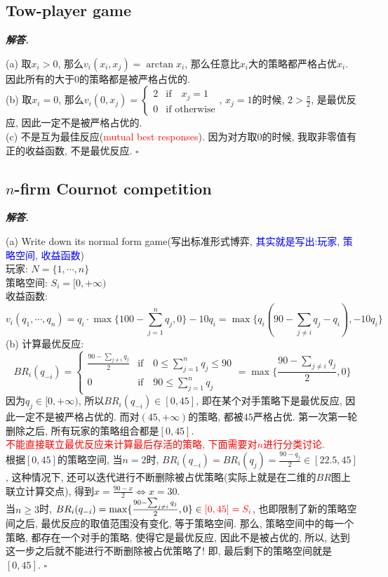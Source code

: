 \documentclass[10pt, a4paper, oneside]{ctexart}
\newenvironment{solution}{%
  \par\noindent\textbf{\textit{解答. }}\ignorespaces
}{%
  \hfill\ensuremath{\square}\par %
}
\begin{document}
\subsection{Tow-player game}
\begin{solution}
(a) 取$x_i>0$, 那么$v_i(x_i,x_j)=\arctan x_i$, 那么任意比$x_i$大的策略都严格占优$x_i$. 因此所有的大于$0$的策略都是被严格占优的.\\
(b) 取$x_i=0$, 那么$v_i(0,x_j)=\begin{cases}
    2& \text{if} \quad x_j=1\\
    0 & \text{if otherwise}
\end{cases}$, $x_j=1$的时候, $2>\frac{\pi}{2}$, 是最优反应, 因此一定不是被严格占优的.\\
(c) 不是互为最佳反应(\textcolor{red}{mutual best responses}). 因为对方取$0$的时候, 我取非零值有正的收益函数, 不是最优反应.
\end{solution}

\subsection{\texorpdfstring{$n$-firm Cournot competition}{n-firm Cournot competition}}


\begin{solution}
    (a) Write down its normal form game(写出标准形式博弈, \textcolor{blue}{其实就是写出:玩家, 策略空间, 收益函数})\\
    玩家: $N=\{1,\cdots,n\}$\\
    策略空间: $S_i=[0,+\infty)$\\
    收益函数: 
    $$v_i(q_1,\cdots,q_n)=q_i\cdot\max\{100-\sum_{j=1}^nq_j,0\}-10q_i=\max\{q_i(90-\sum_{j\neq i}q_j -q_i), -10q_i\}$$
    (b) 计算最优反应: 
    $$BR_i(q_{-i})=\begin{cases}
        \frac{90-\sum_{j\neq i}q_j}{2}&\text{if} \quad 0\leq \sum_{j=1}^n q_j \leq 90\\
        0&\text{if} \quad  90\leq \sum_{j=1}^n q_j 
    \end{cases}=\max\{\frac{90-\sum_{j\neq i}q_j}{2},0\}$$
    因为$q_j\in [0,+\infty)$, 所以$BR_i(q_{-i})\in [0,45]$, 即在某个对手策略下是最优反应, 因此一定不是被严格占优的. 而对$(45,+\infty)$的策略, 都被$45$严格占优. 第一次第一轮删除之后, 所有玩家的策略组合都是$[0,45]$.\\
    \textcolor{red}{不能直接联立最优反应来计算最后存活的策略, 下面需要对$n$进行分类讨论.}\\
    根据$[0,45]$的策略空间, 当$n=2$时, $BR_i(q_{-i})=BR_i(q_j)=\frac{90-q_j}{2}\in [22.5,45]$, 这种情况下, 还可以迭代进行不断删除被占优策略(实际上就是在二维的$BR$图上联立计算交点), 得到$x=\frac{90-x}{2}\iff x=30$.\\
    当$n\geq 3$时, $BR_i(q_{-i})=\max\{\frac{90-\sum_{j\neq i}q_j}{2},0\}\in \textcolor{red}{[0,45]=S_{i}}$, 也即限制了新的策略空间之后, 最优反应的取值范围没有变化, 等于策略空间. 那么, 策略空间中的每一个策略, 都存在一个对手的策略, 使得它是最优反应, 因此不是被占优的, 所以, 达到这一步之后就不能进行不断删除被占优策略了! 即, 最后剩下的策略空间就是$[0,45]$.
    \end{solution}
\end{document}
